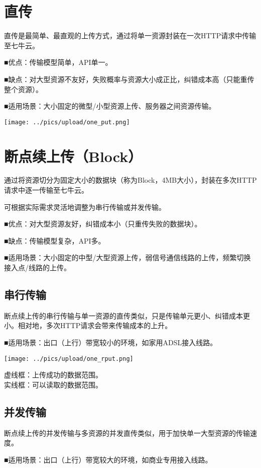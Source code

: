 \documentclass[11pt, oneside]{book}
\newcommand{\qpara}[1]{
\vspace{0.3em}
\noindent
#1\par
\vspace{0.3em}
}
\begin{document}
\section{直传}

\qpara{直传是最简单、最直观的上传方式，通过将单一资源封装在一次HTTP请求中传输至七牛云。}
\qpara{■\thinspace 优点：传输模型简单，API单一。}
\qpara{■\thinspace 缺点：对大型资源不友好，失败概率与资源大小成正比，纠错成本高（只能重传整个资源）。}
\qpara{■\thinspace 适用场景：大小固定的微型/小型资源上传、服务器之间资源传输。}

\begin{center}
\texttt{[image: ../pics/upload/one\_put.png]}
\end{center}

\section{断点续上传（Block）}

\qpara{通过将资源切分为固定大小的数据块（称为Block，4MB大小），封装在多次HTTP请求中逐一传输至七牛云。}
\qpara{可根据实际需求灵活地调整为串行传输或并发传输。}
\qpara{■\thinspace 优点：对大型资源友好，纠错成本小（只重传失败的数据块）。}
\qpara{■\thinspace 缺点：传输模型复杂，API多。}
\qpara{■\thinspace 适用场景：大小固定的中型/大型资源上传，弱信号通信线路的上传，频繁切换接入点/线路的上传。}

\subsection{串行传输}

\qpara{断点续上传的串行传输与单一资源的直传类似，只是传输单元更小、纠错成本更小。相对地，多次HTTP请求会带来传输成本的上升。}
\qpara{■\thinspace 适用场景：出口（上行）带宽较小的环境，如家用ADSL接入线路。}

\begin{center}
\texttt{[image: ../pics/upload/one\_rput.png]}
\end{center}

\qpara{虚线框：上传成功的数据范围。 \\ 实线框：可以读取的数据范围。}

\subsection{并发传输}

\qpara{断点续上传的并发传输与多资源的并发直传类似，用于加快单一大型资源的传输速度。}
\qpara{■\thinspace 适用场景：出口（上行）带宽较大的环境，如商业专用接入线路。}
\end{document}
